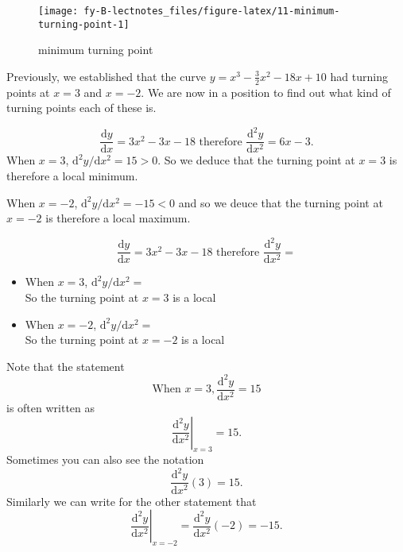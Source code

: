 \documentclass[
  english,
  11pt,
  oneside]{book}
\newcommand{\slide}{}
\theoremstyle{definition}
\theoremstyle{definition}
\theoremstyle{definition}
\theoremstyle{definition}
\theoremstyle{remark}
\begin{document}
\begin{figure}

{\centering \texttt{[image: fy-B-lectnotes\_files/figure-latex/11-minimum-turning-point-1]} 

}

\caption{minimum turning point}\label{fig:11-minimum-turning-point}
\end{figure}
\slide

Previously, we established that the curve \(y = x^3-\frac32 x^2-18x+10\) had turning points at \(x=3\) and \(x=-2\). We are now in a position to find out what kind of turning points each of these is.

\begin{notslides}

\[
\frac{\mathrm{d} y}{\mathrm{d} x} = 3x^2-3x-18\text{ therefore } \frac{\mathrm{d}^{2}y}{\mathrm{d} x^2} = 6x-3.
\]
When \(x = 3\), \(\mathrm{d}^{2}y/\mathrm{d} x^2=15 > 0\). So we deduce that the turning point at \(x=3\) is therefore a local minimum.

When \(x = -2\), \(\mathrm{d}^{2}y/\mathrm{d} x^2 = -15 < 0\) and so we deuce that the turning point at \(x = -2\) is therefore a local maximum.

\end{notslides}

\begin{slidesonly}

\[
\frac{\mathrm{d} y}{\mathrm{d} x} = 3x^2-3x-18\text{ therefore } \frac{\mathrm{d}^{2}y}{\mathrm{d} x^2} = 
\]

\begin{itemize}
\item
  When \(x = 3\), \(\mathrm{d}^{2}y/\mathrm{d} x^2=\)\\
  So the turning point at \(x=3\) is a local
\item
  When \(x = -2\), \(\mathrm{d}^{2}y/\mathrm{d} x^2=\)\\
  So the turning point at \(x=-2\) is a local
\end{itemize}

\end{slidesonly}

\slide

Note that the statement
\[
\text{When }x = 3, \frac{\mathrm{d}^{2}y}{\mathrm{d} x^2} = 15
\]
is often written as
\[
\left.\frac{\mathrm{d}^{2}y}{\mathrm{d} x^2}\right\vert_{x=3} = 15.
\]
Sometimes you can also see the notation
\[
\frac{\mathrm{d}^{2}y}{\mathrm{d} x^2}(3) = 15.
\]
Similarly we can write for the other statement that
\[
\left.\frac{\mathrm{d}^{2}y}{\mathrm{d} x^2}\right\vert_{x=-2} =
\frac{\mathrm{d}^{2}y}{\mathrm{d} x^2}(-2) = -15.
\]
\slide
\end{document}
